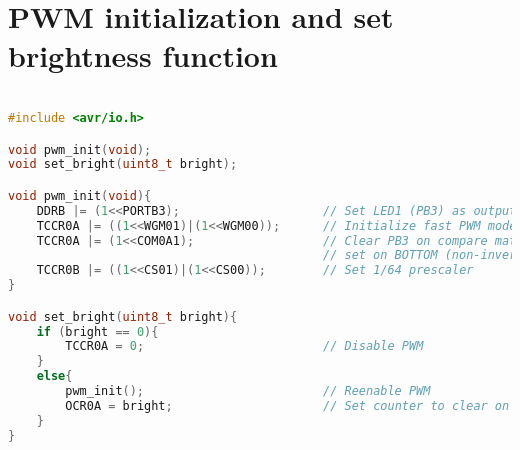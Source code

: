 \section{PWM initialization and set brightness function} \label{cha:ERM_APX1_3}

\begin{lstlisting}[language=C++]

#include <avr/io.h>

void pwm_init(void);
void set_bright(uint8_t bright);

void pwm_init(void){
    DDRB |= (1<<PORTB3);                    // Set LED1 (PB3) as output
    TCCR0A |= ((1<<WGM01)|(1<<WGM00));      // Initialize fast PWM mode
    TCCR0A |= (1<<COM0A1);                  // Clear PB3 on compare match, 
                                            // set on BOTTOM (non-inverting mode)
    TCCR0B |= ((1<<CS01)|(1<<CS00));        // Set 1/64 prescaler
}

void set_bright(uint8_t bright){
    if (bright == 0){
        TCCR0A = 0;                         // Disable PWM
    }
    else{
        pwm_init();                         // Reenable PWM
        OCR0A = bright;                     // Set counter to clear on bright
    }
}

\end{lstlisting}
\clearpage